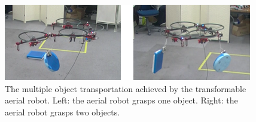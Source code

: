 \begin{figure}[t]
  \begin{center}
    \includegraphics[width=1.0\columnwidth]{figs/object_transportation.png}
  \end{center}
  \caption{The multiple object transportation achieved by the transformable aerial robot. Left: the aerial robot grasps one object. Right: the aerial robot grasps two objects.}
  \label{figure:system}
\end{figure}
